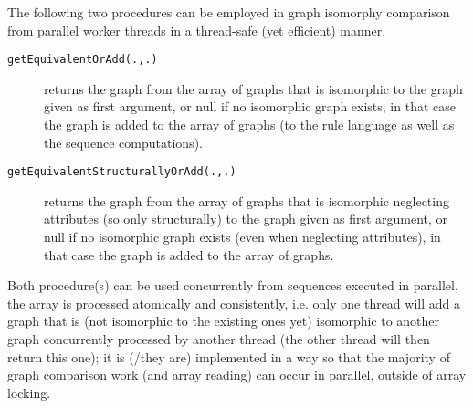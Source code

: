 The following two procedures can be employed in graph isomorphy comparison from parallel worker threads in a thread-safe (yet efficient) manner.

\begin{description}
\item[\texttt{getEquivalentOrAdd(.,.)}] returns the graph from the array of graphs 
  that is isomorphic to the graph given as first argument, or null if no isomorphic graph exists,
  in that case the graph is added to the array of graphs (to the rule language as well as the sequence computations).
\item[\texttt{getEquivalentStructurallyOrAdd(.,.)}] returns the graph from the array of graphs
  that is isomorphic neglecting attributes (so only structurally) to the graph given as first argument,
  or null if no isomorphic graph exists (even when neglecting attributes), in that case the graph is added to the array of graphs.
\end{description}
 
Both procedure(s) can be used concurrently from sequences executed in parallel,
the array is processed atomically and consistently, i.e. only one thread will add a graph
that is (not isomorphic to the existing ones yet) isomorphic to another graph concurrently processed by another thread (the other thread will then return this one);
it is (/they are) implemented in a way so that the majority of graph comparison work (and array reading) can occur in parallel, outside of array locking.

